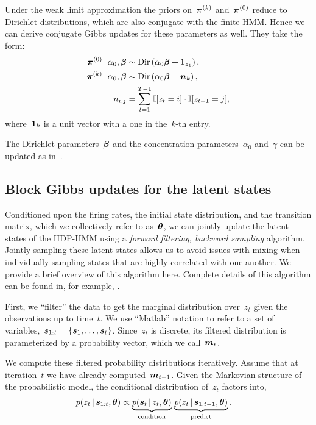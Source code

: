 Under the weak limit approximation the priors on~$\boldsymbol{\pi}^{(k)}$
and~$\boldsymbol{\pi}^{(0)}$ reduce to Dirichlet distributions, which are also conjugate
with the finite HMM. Hence we can derive conjugate Gibbs updates for
these parameters as well. They take the form:
\begin{align*}
  \boldsymbol{\pi}^{(0)} \,|\, \alpha_0, \boldsymbol{\beta} &\sim \mathrm{Dir}\left(\alpha_0\boldsymbol{\beta} + \boldsymbol{1}_{z_1}\right),\\
  \boldsymbol{\pi}^{(k)} \,|\, \alpha_0, \boldsymbol{\beta} &\sim \mathrm{Dir}\left(\alpha_0\boldsymbol{\beta} + \boldsymbol{n}_{k}\right),\\
  n_{i,j}&=\sum_{t=1}^{T-1} \mathbb{I}[z_t=i] \cdot \mathbb{I}[z_{t+1}=j],
\end{align*}
where~$\boldsymbol{1}_k$ is a unit vector with a one in the~$k$-th entry.

The Dirichlet parameters~$\boldsymbol{\beta}$ and the concentration
parameters~$\alpha_0$ and~$\gamma$ can be updated as
in~\citep{Teh06}. 

\subsection{Block Gibbs updates for the latent states}
\label{sec:block_gibbs_hmm}
Conditioned upon the firing rates, the initial state distribution, and
the transition matrix, which we collectively refer to as~$\boldsymbol{\theta}$,
we can jointly update the latent states of the
HDP-HMM using a \emph{forward filtering, backward sampling}
algorithm. Jointly sampling
these latent states allows us to avoid issues with mixing when
individually sampling states that are highly correlated with one
another. We provide a brief overview of this algorithm here.
Complete details of this algorithm can be found in,
for example, \citet{Johnson14b}. 

First, we ``filter'' the data to get the marginal distribution
over~$z_t$ given the observations up to time~$t$. We use ``Matlab''
notation to refer to a set of variables,~${\boldsymbol{s}_{1:t}=\{\boldsymbol{s}_1, \ldots, \boldsymbol{s}_t\}}$.
Since~$z_t$ is discrete, its filtered distribution is parameterized by a
probability vector, which we call~$\boldsymbol{m}_{t}$.

We compute these filtered probability distributions iteratively.
Assume that at iteration~$t$ we
have already computed~$\boldsymbol{m}_{t-1}$. Given the
Markovian structure of the probabilistic model, the
conditional distribution of~$z_t$ factors into,
\begin{align*}
  p(z_t \,|\, \boldsymbol{s}_{1:t}, \boldsymbol{\theta})
  &\propto
  \underbrace{p(\boldsymbol{s}_t \,|\, z_t, \boldsymbol{\theta})}_{\text{condition}} \,
  \underbrace{p(z_{t} \,|\, \boldsymbol{s}_{1:t-1}, \boldsymbol{\theta})}_{\text{predict}}.
\end{align*}

